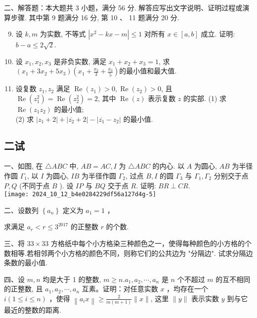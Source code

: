 二、解答题：本大题共 3 小题，满分 56 分. 解答应写出文字说明、证明过程或演算步骤. 其中第 9 题满分 16 分, 第 10 、 11 题满分 20 分.
\begin{enumerate}
  \setcounter{enumi}{8}
  \item 设 $k, m$ 为实数, 不等式 $\left|x^{2}-k x-m\right| \leqslant 1$ 对所有 $x \in[a, b]$ 成立. 证明: $b-a \leqslant 2 \sqrt{2}$.
  \item 设 $x_{1}, x_{2}, x_{3}$ 是非负实数, 满足 $x_{1}+x_{2}+x_{3}=1$, 求 $\left(x_{1}+3 x_{2}+5 x_{3}\right)\left(x_{1}+\frac{x_{2}}{3}+\frac{x_{3}}{5}\right)$的最小值和最大值.
  \item 设复数 $z_{1}, z_{2}$ 满足 $\operatorname{Re}\left(z_{1}\right)>0, \operatorname{Re}\left(z_{2}\right)>0$, 且 $\operatorname{Re}\left(z_{1}^{2}\right)=\operatorname{Re}\left(z_{2}^{2}\right)=2$, 其中 $\operatorname{Re}(z)$ 表示复数 $z$ 的实部.
  (1) 求 $\operatorname{Re}\left(z_{1} z_{2}\right)$ 的最小值;\\
  (2) 求 $\left|z_{1}+2\right|+\left|\overline{z_{2}}+2\right|-\left|\overline{z_{1}}-z_{2}\right|$ 的最小值.
  
\end{enumerate}

\subsection*{二试}
一、如图, 在 $\triangle A B C$ 中, $A B=A C, I$ 为 $\triangle A B C$ 的内心. 以 $A$ 为圆心, $A B$ 为半径作圆 $\Gamma_{1}$, 以 $I$ 为圆心, $I B$ 为半径作圆 $\Gamma_{2}$, 过点 $B, I$ 的圆 $\Gamma_{3}$ 与 $\Gamma_{1}, \Gamma_{2}$ 分别交于点 $P, Q$ (不同于点 $B$ ). 设 $I P$ 与 $B Q$ 交于点 $R$. 证明: $B R \perp C R$.\\
\texttt{[image: 2024\_10\_12\_b4e0284229df56a127d4g-5]}

二、设数列 $\left\{a_{n}\right\}$ 定义为 $a_{1}=1$ ，

求满足 $a_{r}<r \leqslant 3^{2017}$ 的正整数 $r$ 的个数.

三、将 $33 \times 33$ 方格纸中每个小方格染三种颜色之一，使得每种颜色的小方格的个数相等.若相邻两个小方格的颜色不同，则称它们的公共边为 "分隔边". 试求分隔边条数的最小值.

四、设 $m, n$ 均是大于 1 的整数, $m \geqslant n . a_{1}, a_{2}, \cdots, a_{n}$ 是 $n$ 个不超过 $m$ 的互不相同的正整数, 且 $a_{1}, a_{2}, \cdots, a_{n}$ 互素。证明：对任意实数 $x$ ，均存在一个 $i(1 \leqslant i \leqslant n)$ ，使得 $\left\|a_{i} x\right\| \geqslant \frac{2}{m(m+1)}\|x\|$, 这里 $\|y\|$ 表示实数 $y$ 到与它最近的整数的距离.


